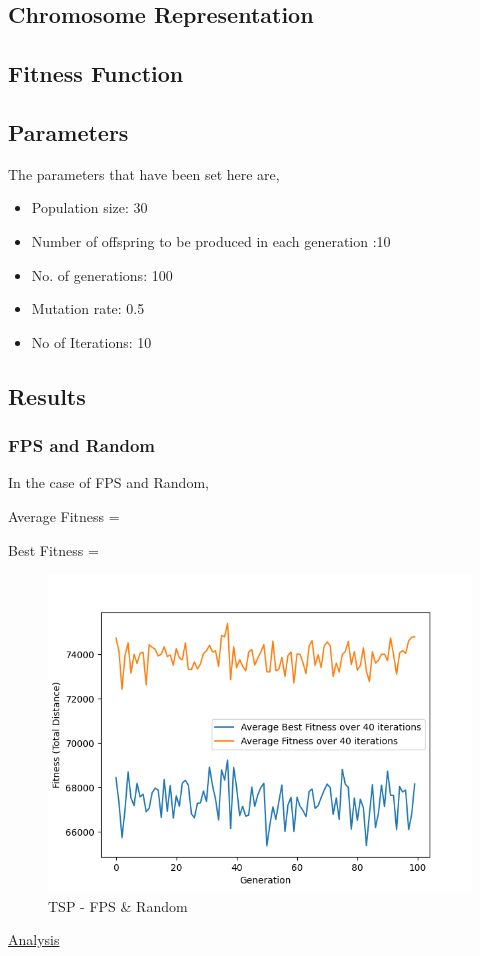 \documentclass[11pt, letterpaper]{article}
\begin{document}
\subsection{Chromosome Representation}

\subsection{Fitness Function}
\subsection{Parameters}
The parameters that have been set here are,
\begin{itemize}
    \item Population size: 30
    \item Number of offspring to be produced in each generation :10
    \item No. of generations: 100
    \item Mutation rate: 0.5
    \item No of Iterations: 10
\end{itemize}
\subsection{Results} 
\subsubsection {FPS and Random}
In the case of FPS and Random,

Average Fitness = 

Best Fitness = 
\begin{figure}[H]
    \centering
    \includegraphics[scale = 0.6]{images/tsp_fp_rd.png}
    \caption {TSP - FPS \& Random}
    \label {fig:tpsFR}
\end{figure}
\underline{Analysis}
\end{document}
